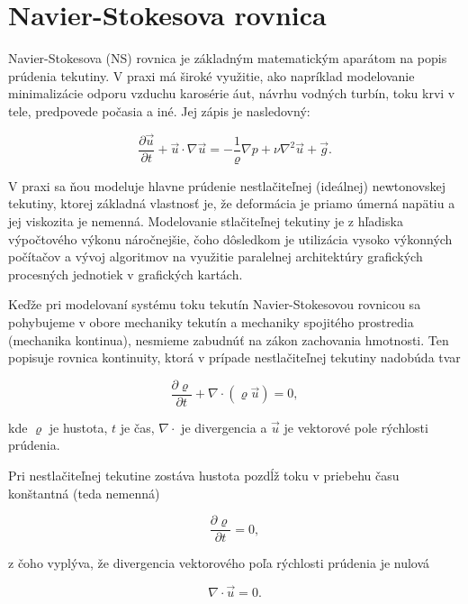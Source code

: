 \documentclass[]{tukediphc}
\begin{document}
\section{Navier-Stokesova rovnica}

Navier-Stokesova (NS) rovnica je základným matematickým aparátom na popis prúdenia tekutiny. V praxi má široké využitie, ako napríklad modelovanie minimalizácie odporu vzduchu karosérie áut, návrhu vodných turbín, toku krvi v tele, predpovede počasia a iné. Jej zápis je nasledovný:

\begin{equation}
\frac{\partial \vec{u}}{\partial t} + \vec{u} \cdot \nabla \vec{u} = - \frac{1}{\varrho} \nabla p + \nu \nabla^2 \vec{u} + \vec{g}.
\end{equation}

V praxi sa ňou modeluje hlavne prúdenie nestlačiteľnej (ideálnej) newtonovskej tekutiny, ktorej základná vlastnosť je, že deformácia je priamo úmerná napätiu a jej viskozita je nemenná. Modelovanie stlačiteľnej tekutiny je z hľadiska výpočtového výkonu náročnejšie, čoho dôsledkom je utilizácia vysoko výkonných počítačov a vývoj algoritmov na využitie paralelnej architektúry grafických procesných jednotiek v grafických kartách.

Keďže pri modelovaní systému toku tekutín Navier-Stokesovou rovnicou sa pohybujeme v obore mechaniky tekutín a mechaniky spojitého prostredia (mechanika kontinua), nesmieme zabudnúť na zákon zachovania hmotnosti. Ten popisuje rovnica kontinuity, ktorá v prípade nestlačiteľnej tekutiny nadobúda tvar

\begin{equation}
\frac{\partial \varrho}{\partial t} + \nabla \cdot (\varrho \vec{u}) = 0, 
\end{equation}

kde $\varrho$  je hustota, $t$ je čas, $\nabla \cdot$ je divergencia a $\vec{u}$ je vektorové pole rýchlosti prúdenia.

Pri nestlačiteľnej tekutine zostáva hustota pozdĺž toku v priebehu času konštantná (teda nemenná)

\begin{equation}
\frac{\partial \varrho}{\partial t} = 0, 
\end{equation}

z čoho vyplýva, že divergencia vektorového poľa rýchlosti prúdenia je nulová

\begin{equation}
\nabla \cdot \vec{u} = 0.
\end{equation}
\end{document}
